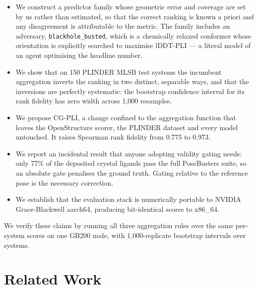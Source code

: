 \documentclass{article} %
\begin{document}
\begin{itemize}
\item We construct a predictor family whose geometric error and coverage are set by us
      rather than estimated, so that the correct ranking is known a priori and any
      disagreement is attributable to the metric. The family includes an adversary,
      \texttt{blackhole\_busted}, which is a chemically relaxed conformer whose
      orientation is explicitly searched to maximise lDDT-PLI --- a literal model of an
      agent optimising the headline number.
\item We show that on 150 PLINDER MLSB test systems the incumbent aggregation inverts
      the ranking in two distinct, separable ways, and that the inversions are perfectly
      systematic: the bootstrap confidence interval for its rank fidelity has zero width
      across 1{,}000 resamples.
\item We propose CG-PLI, a change confined to the aggregation function that leaves the
      OpenStructure scorer, the PLINDER dataset and every model untouched. It raises
      Spearman rank fidelity from 0.775 to 0.973.
\item We report an incidental result that anyone adopting validity gating needs: only
      77\% of the deposited crystal ligands pass the full PoseBusters suite, so an
      absolute gate penalises the ground truth. Gating relative to the reference pose is
      the necessary correction.
\item We establish that the evaluation stack is numerically portable to NVIDIA
      Grace-Blackwell aarch64, producing bit-identical scores to x86\_64.
\end{itemize}

We verify these claims by running all three aggregation rules over the same per-system
scores on one GB200 node, with 1{,}000-replicate bootstrap intervals over systems.

\section{Related Work}
\label{sec:related}
\end{document}
